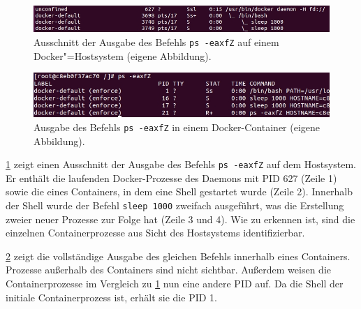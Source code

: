\documentclass[../main.tex]{subfiles}
\begin{document}
			\begin{figure}[h]
					\centering
					\includegraphics[width=1.0\textwidth]{./images/sec_pidNsHost.jpg}
					\caption{Ausschnitt der Ausgabe des Befehls \texttt{ps -eaxfZ} auf einem Docker"=Hostsystem (eigene Abbildung).}
					\label{fig:sec_pidNsHost}
			\end{figure}

			\begin{figure}[h]
					\centering
					\includegraphics[width=1.0\textwidth]{./images/sec_pidNsContainer.jpg}
					\caption{Ausgabe des Befehls \texttt{ps -eaxfZ} in einem Docker-Container (eigene Abbildung).}
					\label{fig:sec_pidNsContainer}
			\end{figure}

			\fig \ref{fig:sec_pidNsHost} zeigt einen Ausschnitt der Ausgabe des Befehls \texttt{ps -eaxfZ} auf dem Hostsystem. Er enthält die laufenden Docker-Prozesse des Daemons mit PID 627 (Zeile 1) sowie die eines Containers, in dem eine Shell gestartet wurde (Zeile 2). Innerhalb der Shell wurde der Befehl \texttt{sleep 1000} zweifach ausgeführt, was die Erstellung zweier neuer Prozesse zur Folge hat (Zeile 3 und 4). Wie zu erkennen ist, sind die einzelnen Containerprozesse aus Sicht des Hostsystems identifizierbar.


			\fig \ref{fig:sec_pidNsContainer} zeigt die vollständige Ausgabe des gleichen Befehls innerhalb eines Containers. Prozesse außerhalb des Containers sind nicht sichtbar. Außerdem weisen die Containerprozesse im Vergleich zu \fig \ref{fig:sec_pidNsHost} nun eine andere PID auf. Da die Shell der initiale Containerprozess ist, erhält sie die PID 1.

\end{document}
